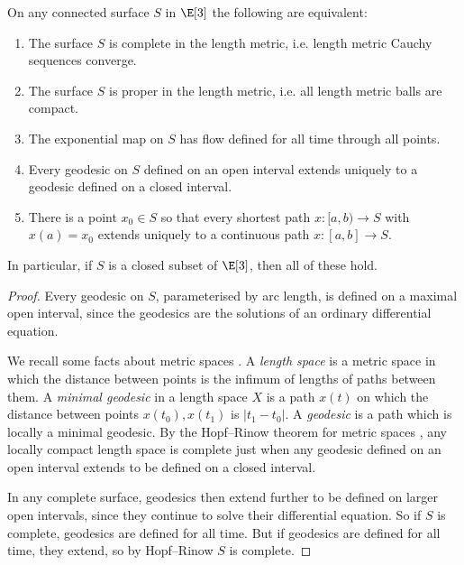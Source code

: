 \begin{corollary}
On any connected surface \(S\) in \(\E[3]\) the following are equivalent:
\begin{enumerate}
\item The surface \(S\) is complete in the length metric, i.e. length metric Cauchy sequences converge.
\item The surface \(S\) is proper in the length metric, i.e. all length metric balls are compact.
\item The exponential map on \(S\) has flow defined for all time through all points.
\item Every geodesic on \(S\) defined on an open interval extends uniquely to a geodesic defined on a closed interval.
\item There is a point \(x_0 \in S\) so that every shortest path \(x \colon [a,b) \to S\) with \(x(a)=x_0\) extends uniquely to a continuous path \(x \colon [a,b] \to S\).
\end{enumerate}
In particular, if \(S\) is a closed subset of \(\E[3]\), then all of these hold.
\end{corollary}
\begin{proof}
Every geodesic on \(S\), parameterised by arc length, is defined on a maximal open interval, since the geodesics are the solutions of an ordinary differential equation.

We recall some facts about metric spaces \cite{Gromov:2007}.
A \emph{length space} is a metric space in which the distance between points is the infimum of lengths of paths between them.
A \emph{minimal geodesic} in a length space \(X\) is a path \(x(t)\) on which the distance between points \(x(t_0), x(t_1)\) is \(|t_1-t_0|\).
A \emph{geodesic} is a path which is locally a minimal geodesic.
By the Hopf--Rinow theorem for metric spaces \cite{Gromov:2007,McKay:2018}, any locally compact length space is complete just when any geodesic defined on an open interval extends to be defined on a closed interval.

In any complete surface, geodesics then extend further to be defined on larger open intervals, since they continue to solve their differential equation.
So if \(S\) is complete, geodesics are defined for all time.
But if geodesics are defined for all time, they extend, so by Hopf--Rinow \(S\) is complete.
\end{proof}

